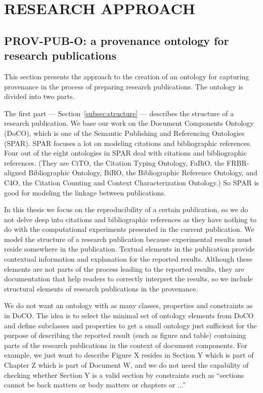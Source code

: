 \chapter{RESEARCH APPROACH}
\label{research-approach}



\section{PROV-PUB-O: a provenance ontology for research publications}
This section presents the approach to the creation of an ontology for capturing provenance in the process of preparing research publications. The ontology is divided into two parts. 

The first part --- Section~\ref{subsec:structure} --- describes the structure of a research publication. We base our work on the Document Components Ontology (DoCO), which is one of the Semantic Publishing and Referencing Ontologies (SPAR). SPAR focuses a lot on modeling citations and bibliographic references. Four out of the eight ontologies in SPAR deal with citations and bibliographic references. (They are CiTO, the Citation Typing Ontology, FaBiO, the FRBR-aligned Bibliographic Ontology, BiRO, the Bibliographic Reference Ontology, and C4O, the Citation Counting and Context Characterization Ontology.) So SPAR is good for modeling the linkage between publications. 

In this thesis we focus on the reproducibility of a certain publication, so we do not delve deep into citations and bibliographic references as they have nothing to do with the computational experiments presented in the current publication. We model the structure of a research publication because experimental results must reside somewhere in the publication. Textual elements in the publication provide contextual information and explanation for the reported results. Although these elements are not parts of the process leading to the reported results, they are documentation that help readers to correctly interpret the results, so we include structural elements of research publications in the provenance.

We do not want an ontology with as many classes, properties and constraints as in DoCO. The idea is to select the minimal set of ontology elements from DoCO and define subclasses and properties to get a small ontology just sufficient for the purpose of describing the reported result (such as figure and table) containing parts of the research publications in the context of document components. For example, we just want to describe Figure X resides in Section Y which is part of Chapter Z which is part of Document W, and we do not need the capability of checking whether Section Y is a valid section by constraints such as ``sections cannot be back matters or body matters or chapters or ...'' 

